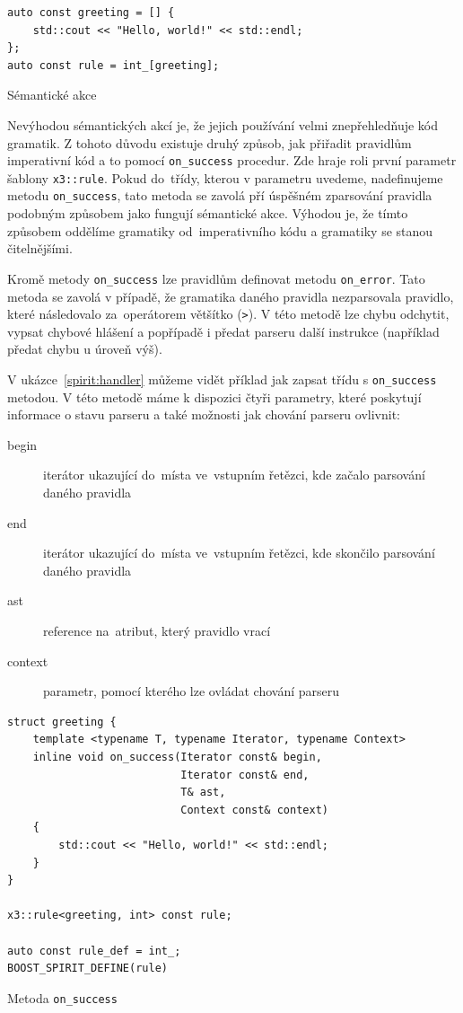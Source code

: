 \documentclass[thesis=B,czech,hidelinks]{FITthesis}[2019/03/06]
\begin{document}
\begin{listing}
\begin{verbatim}
auto const greeting = [] {
    std::cout << "Hello, world!" << std::endl;
};
auto const rule = int_[greeting];
\end{verbatim}
\caption{Sémantické akce}\label{spirit:semantic}
\end{listing}

Nevýhodou sémantických akcí je, že jejich používání velmi znepřehledňuje kód gramatik. Z tohoto důvodu existuje druhý způsob, jak přiřadit pravidlům imperativní kód a to pomocí \verb¨on_success¨ procedur. Zde hraje roli první parametr šablony \texttt{x3::rule}. Pokud do~třídy, kterou v parametru uvedeme, nadefinujeme metodu \verb¨on_success¨, tato metoda se zavolá pří úspěšném zparsování pravidla podobným způsobem jako fungují sémantické akce. Výhodou je, že tímto způsobem oddělíme gramatiky od~imperativního kódu a gramatiky se stanou čitelnějšími.

Kromě metody \verb¨on_success¨ lze pravidlům definovat metodu \verb¨on_error¨. Tato metoda se zavolá v případě, že gramatika daného pravidla nezparsovala pravidlo, které následovalo za~operátorem většítko (\texttt{>}). V této metodě lze chybu odchytit, vypsat chybové hlášení a popřípadě i předat parseru další instrukce (například předat chybu u úroveň výš).

V ukázce~\ref{spirit:handler} můžeme vidět příklad jak zapsat třídu s \verb¨on_success¨ metodou. V této metodě máme k dispozici čtyři parametry, které poskytují informace o stavu parseru a také možnosti jak chování parseru ovlivnit:
\begin{description}
    \item[begin]{iterátor ukazující do~místa ve~vstupním řetězci, kde začalo parsování daného pravidla}
    \item[end]{iterátor ukazující do~místa ve~vstupním řetězci, kde skončilo parsování daného pravidla}
    \item[ast]{reference na~atribut, který pravidlo vrací}
    \item[context]{parametr, pomocí kterého lze ovládat chování parseru}
\end{description}

\begin{listing}
\begin{verbatim}
struct greeting {
    template <typename T, typename Iterator, typename Context>
    inline void on_success(Iterator const& begin,
                           Iterator const& end,
                           T& ast,
                           Context const& context)
    {
        std::cout << "Hello, world!" << std::endl;
    }
}

x3::rule<greeting, int> const rule;

auto const rule_def = int_;
BOOST_SPIRIT_DEFINE(rule)
\end{verbatim}
\caption{Metoda \texttt{on\_success}}\label{spirit:handler}
\end{listing}
\end{document}
